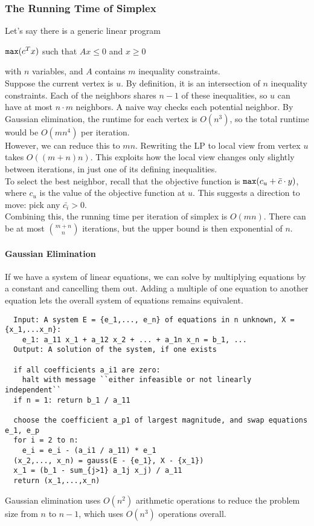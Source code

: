 \subsubsection{The Running Time of Simplex}
Let's say there is a generic linear program
\begin{center}
  $\verb|max|(c^T x)$ such that $Ax \leq 0$ and $x \geq 0$
\end{center}
with $n$ variables, and $A$ contains $m$ inequality constraints.\\
Suppose the current vertex is $u$.
By definition, it is an intersection of $n$ inequality constraints.
Each of the neighbors shares $n-1$ of these inequalities, so $u$ can have at most $n \cdot m$ neighbors.
A naive way checks each potential neighbor.
By Gaussian elimination, the runtime for each vertex is $O(n^3)$, so the total runtime would be $O(mn^4)$ per iteration.\\
However, we can reduce this to $mn$.
Rewriting the LP to local view from vertex $u$ takes $O((m+n)n)$.
This exploits how the local view changes only slightly between iterations, in just one of its defining inequalities.\\
To select the best neighbor,  recall that the objective function is $\verb|max|(c_u + \bar{c} \cdot y)$, where $c_u$ is the value of the objective function at $u$.
This suggests a direction to move: pick any $\bar{c_i} > 0$.\\
Combining this, the running time per iteration of simplex is $O(mn)$.
There can be at most $m+n \choose n$ iterations, but the upper bound is then exponential of $n$.

\paragraph{Gaussian Elimination}
If we have a system of linear equations, we can solve by multiplying equations by a constant and cancelling them out.
Adding a multiple of one equation to another equation lets the overall system of equations remains equivalent.
\begin{verbatim}
  Input: A system E = {e_1,..., e_n} of equations in n unknown, X = {x_1,...x_n}:
    e_1: a_11 x_1 + a_12 x_2 + ... + a_1n x_n = b_1, ...
  Output: A solution of the system, if one exists
  
  if all coefficients a_i1 are zero:
    halt with message ``either infeasible or not linearly independent``
  if n = 1: return b_1 / a_11

  choose the coefficient a_p1 of largest magnitude, and swap equations e_1, e_p
  for i = 2 to n:
    e_i = e_i - (a_i1 / a_11) * e_1
  (x_2,..., x_n) = gauss(E - {e_1}, X - {x_1})
  x_1 = (b_1 - sum_{j>1} a_1j x_j) / a_11
  return (x_1,...,x_n)
\end{verbatim}
Gaussian elimination uses $O(n^2)$ arithmetic operations to reduce the problem size from $n$ to $n-1$, which uses $O(n^3)$ operations overall.



